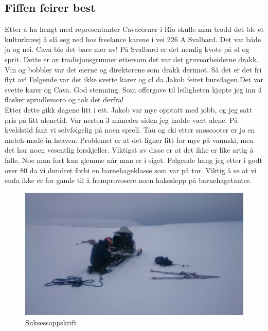 \subsection*{Fiffen feirer best}

Etter å ha hengt med representanter Cavacorner i Rio skulle man trodd
det ble et kulturkræsj å slå seg ned hos freelance karene i vei 226 A
Svalbard. Det var både ja og nei. Cava ble det bare mer av! På
Svalbard er det nemlig kvote på øl og sprit. Dette er av
tradisjonsgrunner ettersom det var det gruvearbeiderne drakk. Vin og
bobbler var det eierne og direktørene som drakk derimot. Så det er det
fri flyt av! Følgende var det ikke svette karer og øl da Jakob feiret
bursdagen.Det var svette karer og Cava. God stemning. Som offergave
til leiligheten kjøpte jeg inn 4 flasker sprudlemoro og tok det
derfra!\\


Etter dette gikk dagene litt i ett. Jakob var mye opptatt med jobb, og
jeg satt pris på litt alenetid. Var nesten 3 måneder siden jeg hadde
vært alene. På kveldstid fant vi selvfølgelig på noen sprell. Tau og
ski etter snøscooter er jo en match-made-in-heaven. Problemet er at
det ligner litt for mye på vannski, men det har noen vesentlig
forskjeller. Viktigst av disse er at det  ikke er like
artig å falle. Noe man fort kan glemme når man er i siget. Følgende
hang jeg etter i godt over 80 da vi dundret forbi en
barnehageklasse som var på tur. Viktig å se at vi enda ikke er for
gamle til å fremprovosere noen hakeslepp på barnehagetanter.\\
\begin{figure}[]
	\centering
	\includegraphics[width=\textwidth]{Scooterogski}
	\caption{Suksessoppskrift}
\label{fig:trollsteinen}
\end{figure}

